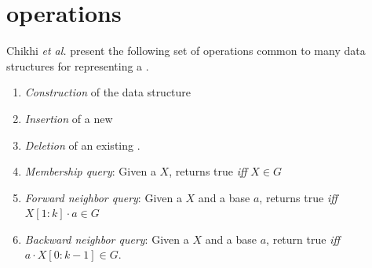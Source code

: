 
\section{\dBG operations}
\label{subsubsec:dbg-operations}

Chikhi \emph{et al.} \cite{Chikhi2019} present the following set of operations common to many data structures for representing a \dBG.

\begin{enumerate}
  \item \emph{Construction} of the data structure
  \item \emph{Insertion} of a new \kmer
  \item \emph{Deletion} of an existing \kmer.
  \item \emph{Membership query}: Given a \kmer $X$, returns true \emph{iff} $X \in G$
  \item \emph{Forward neighbor query}: Given a \kmer $X$ and a base $a$, returns true \emph{iff} $X[1:k] \cdot a \in G$
  \item \emph{Backward neighbor query}: Given a \kmer $X$ and a base $a$, return true \emph{iff} $a \cdot X[0:k-1] \in G$.
\end{enumerate}

